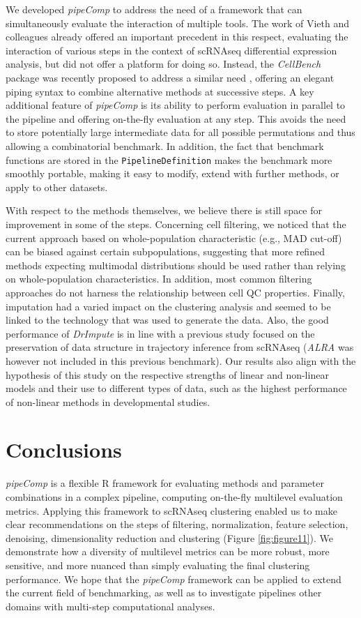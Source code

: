\documentclass{bmcart}
\begin{document}
We developed \textit{pipeComp} to address the need of a framework that can simultaneously evaluate the interaction of multiple tools. The work of Vieth and colleagues\cite{viethSystematic2019} already offered an important precedent in this respect, evaluating the interaction of various steps in the context of scRNAseq differential expression analysis, but did not offer a platform for doing so. Instead, the \textit{CellBench} package was recently proposed to address a similar need \cite{suCellbench}, offering an elegant piping syntax to combine alternative methods at successive steps. A key additional feature of \textit{pipeComp} is its ability to perform evaluation in parallel to the pipeline and offering on-the-fly evaluation at any step. This avoids the need to store potentially large intermediate data for all possible permutations and thus allowing a combinatorial benchmark. In addition, the fact that benchmark functions are stored in the \texttt{PipelineDefinition} makes the benchmark more smoothly portable, making it easy to modify, extend with further methods, or apply to other datasets.

With respect to the methods themselves, we believe there is still space for improvement in some of the steps. Concerning cell filtering, we noticed that the current approach based on whole-population characteristic (e.g., MAD cut-off) can be biased against certain subpopulations, suggesting that more refined methods expecting multimodal distributions should be used rather than relying on whole-population characteristics. In addition, most common filtering approaches do not harness the relationship between cell QC properties. Finally, imputation had a varied impact on the clustering analysis and seemed to be linked to the technology that was used to generate the data. Also, the good performance of \textit{DrImpute} is in line with a previous study focused on the preservation of data structure in trajectory inference from scRNAseq \cite{ZhangImput2018} (\textit{ALRA} was however not included in this previous benchmark). Our results also align with the hypothesis of this study on the respective strengths of linear and non-linear models and their use to different types of data, such as the highest performance of non-linear methods in developmental studies. 

\section*{Conclusions}

\textit{pipeComp} is a flexible R framework for evaluating methods and parameter combinations in a complex pipeline, computing on-the-fly multilevel evaluation metrics. Applying this framework to scRNAseq clustering enabled us to make clear recommendations on the steps of filtering, normalization, feature selection, denoising, dimensionality reduction and clustering (Figure \ref{fig:figure11}). We demonstrate how a diversity of multilevel metrics can be more robust, more sensitive, and more nuanced than simply evaluating the final clustering performance. We hope that the \textit{pipeComp} framework can be applied to extend the current field of benchmarking, as well as to investigate pipelines other domains with multi-step computational analyses.
\end{document}
